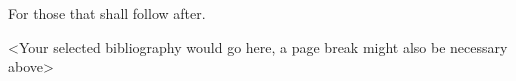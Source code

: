 \documentclass[letterpaper,10pt]{article} %
\begin{document}
\begin{dedication}
For those that shall follow after.
\end{dedication}\newpage


\bodymatter     %








% 
% 
% 

\backmatter     %



\cleardoublepage
\begin{selected-bibliography}
<Your selected bibliography would go here, a page break might also be necessary above>
\end{selected-bibliography}








\end{document}
